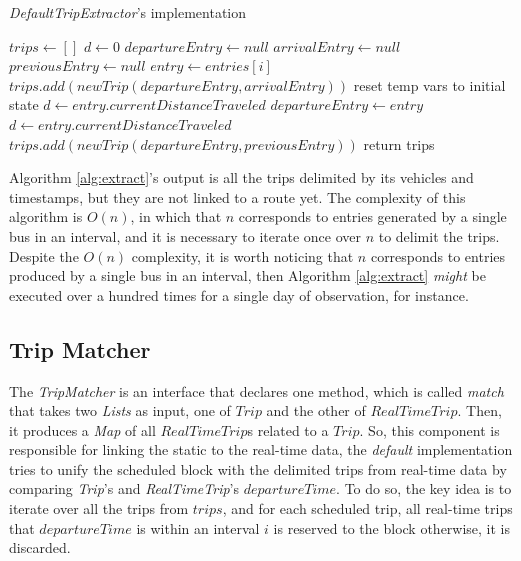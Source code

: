 \begin{algorithm}[t]
\caption{\textit{DefaultTripExtractor}'s implementation}\label{alg:extract}
\begin{algorithmic}[1]
\State $trips \gets [ ]$
\State $d \gets 0$ 
 \label{alg:extract:d}
\State $departureEntry \gets null$
\State $arrivalEntry \gets null$
\State $previousEntry \gets null$
    \State $entry \gets entries[i]$
    \label{alg:extract:if}
            \State $trips.add(new Trip(departureEntry, arrivalEntry))$
            \State reset temp vars to initial state
        \Else
            \State $d \gets entry.currentDistanceTraveled$
        \EndIf
            \State $departureEntry \gets entry$
        \EndIf
    \Else
        \label{alg:extract:arrival}
        \State $d \gets entry.currentDistanceTraveled$
    \EndIf
\EndFor 
\State $trips.add(new Trip(departureEntry, previousEntry))$
\State return trips
\end{algorithmic}
\end{algorithm}

Algorithm \ref{alg:extract}'s output is all the trips delimited by its vehicles 
and timestamps, but they are not linked to a route yet. 
The complexity of this algorithm is $O(n)$, in which 
that $n$ corresponds to entries generated by a single bus in an interval, and it is necessary to iterate once over $n$ to delimit the trips.
Despite the $O(n)$ 
complexity, it is worth noticing that $n$ corresponds to entries produced by a single 
bus in an interval, then Algorithm \ref{alg:extract} {\em might} be executed over a hundred times
for a single day of observation, for instance.

\subsection{Trip Matcher}
The \textit{TripMatcher} is an interface that declares one method, which is called
\textit{match} that takes two \textit{Lists} as input, one of $Trip$ and the other
of $RealTimeTrip$. Then, it produces a \textit{Map} of all $RealTimeTrip$s related to a 
$Trip$. So, this component is responsible for linking the static to the real-time data,
the{ \em default} implementation tries to unify the scheduled block with the 
delimited trips from real-time data by comparing \textit{Trip}'s 
and \textit{RealTimeTrip}'s $departureTime$. 
To do so, the key idea is to iterate over all the trips
from $trips$, and for each scheduled trip, all real-time trips 
that $departureTime$ is within an interval $i$ is reserved to the block otherwise, it is discarded. 

